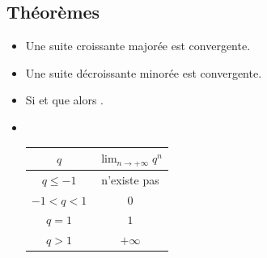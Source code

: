 \begin{fiche}
      \subsection*{Th\'eor\`emes}
            \begin{itemize}
                  \item Une suite croissante major\'ee est convergente.
                  \item Une suite d\'ecroissante minor\'ee est convergente.
                  \item Si 
                        et que 
                        alors  
                        .
                  \item ~\\
                        \begin{tabular}{|c|c|}
                              \hline
                              \rowcolor[gray]{0.8}
                                    \color{black}
                              $q$        & $\displaystyle{\lim_{n\rightarrow+\infty} q^n}$       \\
                              \hline
                              $q\leq -1$ & n'existe pas                           \\
                              \hline
                              $-1<q<1$   & $0$                                    \\
                              \hline
                              $q=1$      & $1$                                    \\
                              \hline
                              $q>1$      & $+\infty$                              \\
                              \hline
                        \end{tabular}
            \end{itemize}

\end{fiche}



























